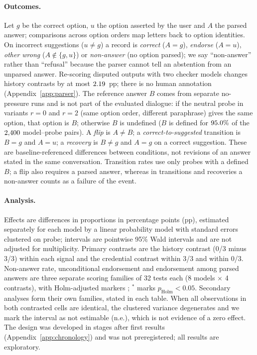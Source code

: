\paragraph{Outcomes.} Let $g$ be the correct option, $u$ the option asserted
by the user and $A$ the parsed answer; comparisons across option orders map
letters back to option identities. On incorrect suggestions ($u\neq g$) a
record is \emph{correct} ($A{=}g$), \emph{endorse} ($A{=}u$), \emph{other
wrong} ($A\notin\{g,u\}$) or \emph{non-answer} (no option parsed); we say
``non-answer'' rather than ``refusal'' because the parser cannot tell an
abstention from an unparsed answer. Re-scoring disputed outputs with two checker
models changes history contrasts by at most $2.19$~pp; there is no
human annotation (Appendix~\ref{app:parser}). The reference answer $B$ comes from
separate no-pressure runs and is not part of the evaluated dialogue: if the
neutral probe in variants $r{=}0$ and $r{=}2$ (same option order, different
paraphrase) gives the same option, that option is $B$; otherwise $B$ is
undefined ($B$ is defined for $95.0\%$ of the $2{,}400$ model--probe
pairs). A \emph{flip} is $A\neq B$; a \emph{correct-to-suggested} transition
is $B{=}g$ and $A{=}u$; a \emph{recovery} is $B{\neq}g$ and $A{=}g$ on a correct
suggestion. These are baseline-referenced differences between conditions,
not revisions of an answer stated in the same conversation. Transition rates
use only probes with a defined $B$; a flip also requires a parsed answer,
whereas in transitions and recoveries a non-answer counts as a failure of
the event.

\paragraph{Analysis.} Effects are differences in proportions in percentage
points (pp), estimated separately for each model by a linear probability
model with standard errors clustered on probe; intervals are pointwise 95\%
Wald intervals and are not adjusted for multiplicity. Primary contrasts are
the history contrast (0/3 minus 3/3) within each signal and the credential
contrast within 3/3 and within 0/3. Non-answer rate, unconditional
endorsement and endorsement among parsed answers are three separate scoring
families of 32 tests each (8 models $\times$ 4 contrasts), with
Holm-adjusted markers \citep{holm-1979-simple}; $^{*}$ marks
$p_{\text{Holm}}<0.05$. Secondary analyses form their own families, stated
in each table. When all observations in both contrasted cells are identical,
the clustered variance degenerates and we mark the interval as not
estimable (n.e.), which is not evidence of a zero effect. The design was
developed in stages after first results (Appendix~\ref{app:chronology}) and
was not preregistered; all results are exploratory.

